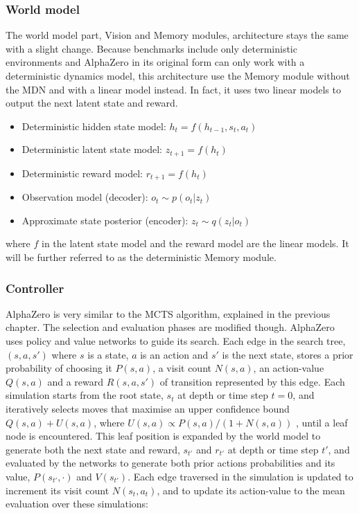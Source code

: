 \subsubsection{World model}

The world model part, Vision and Memory modules, architecture stays the same with a slight change. Because benchmarks include only deterministic environments and AlphaZero in its original form can only work with a deterministic dynamics model, this architecture use the Memory module without the MDN and with a linear model instead. In fact, it uses two linear models to output the next latent state and reward.
\begin{itemize}
\item Deterministic hidden state model:      $h_t = f(h_{t-1}, s_{t}, a_{t})$
\item Deterministic latent state model:      $z_{t+1} = f(h_t)$
\item Deterministic reward model:            $r_{t+1} = f(h_t)$
\item Observation model (decoder):           $o_t \sim p(o_t|z_t)$
\item Approximate state posterior (encoder): $z_t \sim q(z_t|o_t)$
\end{itemize}
where $f$ in the latent state model and the reward model are the linear models. It will be further referred to as the deterministic Memory module.

\subsubsection{Controller}

AlphaZero \cite{Algo.AlphaZero} is very similar to the MCTS algorithm, explained in the previous chapter. The selection and evaluation phases are modified though. AlphaZero uses policy and value networks to guide its search. Each edge in the search tree, $(s, a, s')$ where $s$ is a state, $a$ is an action and $s'$ is the next state, stores a prior probability of choosing it $P(s, a)$, a visit count $N(s, a)$, an action-value $Q(s, a)$ and a reward $R(s, a, s')$ of transition represented by this edge. Each simulation starts from the root state, $s_t$ at depth or time step $t=0$, and iteratively selects moves that maximise an upper confidence bound $Q(s, a) + U(s, a)$, where $U(s, a) \propto P(s, a)/(1+ N(s, a))$ \cite{Algo.AlphaGoZero}, until a leaf node is encountered. This leaf position is expanded by the world model to generate both the next state and reward, $s_{t'}$ and $r_{t'}$ at depth or time step $t'$, and evaluated by the networks to generate both prior actions probabilities and its value, $P(s_{t'}, \cdot)$ and $V(s_{t'})$. Each edge traversed in the simulation is updated to increment its visit count $N(s_t, a_t)$, and to update its action-value to the mean evaluation over these simulations:

